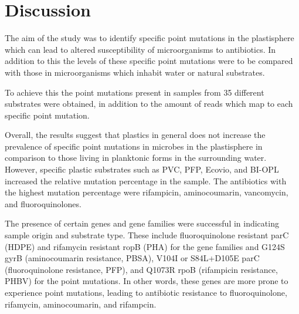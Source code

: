 \chapter{Discussion}



The aim of the study was to identify specific point mutations in the plastisphere which can lead to altered susceptibility of microorganisms to antibiotics. 
In addition to this the levels of these specific point mutations were to be compared with those in microorganisms which inhabit water or natural substrates.

To achieve this the point mutations present in samples from 35 different substrates were obtained, in addition to the amount of reads which map to each specific point mutation. 

Overall, the results suggest that plastics in general does not increase the prevalence of specific point mutations in microbes in the plastisphere in comparison to those living in planktonic forms in the surrounding water.
However, specific plastic substrates such as PVC, PFP, Ecovio, and BI-OPL increased the relative mutation percentage in the sample.
The antibiotics with the highest mutation percentage were rifampicin, aminocoumarin, vancomycin, and fluoroquinolones.

The presence of certain genes and gene families were successful in indicating sample origin and substrate type.
These include fluoroquinolone resistant parC (HDPE) and rifamycin resistant ropB (PHA) for the gene families and G124S gyrB (aminocoumarin resistance, PBSA), V104I or S84L+D105E parC (fluoroquinolone resistance, PFP), and Q1073R rpoB (rifampicin resistance, PHBV) for the point mutations.
In other words, these genes are more prone to experience point mutations, leading to antibiotic resistance to fluoroquinolone, rifamycin, aminocoumarin, and rifampcin.

